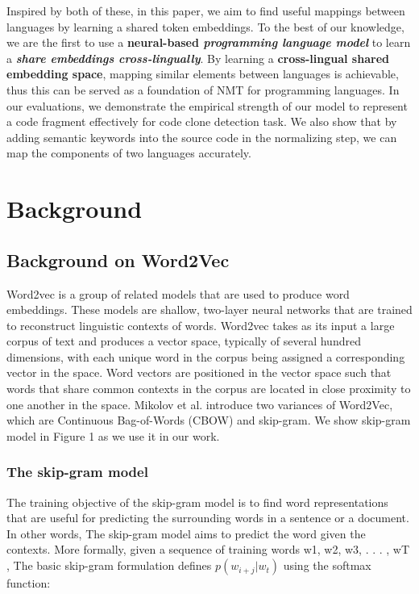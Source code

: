 Inspired by both of these, in this paper, we aim to find useful mappings between languages by learning a shared token embeddings. To the best of our knowledge, we are the first to use a \textbf{neural-based \textit{programming language model}} to learn a \textbf{\textit{share embeddings cross-lingually}}. By learning a \textbf{cross-lingual shared embedding space}, mapping similar elements between languages is achievable, thus this can be served as a foundation of NMT for programming languages. In our evaluations, we demonstrate the empirical strength of our model to represent a code fragment effectively for code clone detection task. We also show that by adding semantic keywords into the source code in the normalizing step, we can map the components of two languages accurately. 

\section{Background}

\subsection{Background on Word2Vec}

Word2vec is a group of related models that are used to produce word embeddings. These models are shallow, two-layer neural networks that are trained to reconstruct linguistic contexts of words. Word2vec takes as its input a large corpus of text and produces a vector space, typically of several hundred dimensions, with each unique word in the corpus being assigned a corresponding vector in the space. Word vectors are positioned in the vector space such that words that share common contexts in the corpus are located in close proximity to one another in the space. Mikolov et al.\cite{mikolov2013distributed} introduce two variances of Word2Vec, which are Continuous Bag-of-Words (CBOW) and skip-gram. We show skip-gram model in Figure 1 as we use it in our work.

\subsubsection{The skip-gram model}
The training objective of the skip-gram model is to find word representations that are useful for predicting the surrounding words in a sentence or a document. In other words, The skip-gram model aims to predict the word given the contexts. More formally, given a sequence of training words w1, w2, w3, . . . , wT , The basic skip-gram formulation defines \begin{math}p(w_{i+j} | w_{t})\end{math} using the softmax function:

